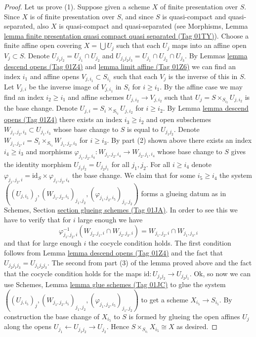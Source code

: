 \documentclass{amsart}
\theoremstyle{plain}
\theoremstyle{definition}
\theoremstyle{remark}
\numberwithin{equation}{subsection}
\begin{document}
\begin{proof}
\medskip\noindent
Let us prove (1). Suppose given a scheme $X$ of finite presentation
over $S$. Since $X$ is of finite presentation
over $S$, and since $S$ is quasi-compact and quasi-separated, also
$X$ is quasi-compact and quasi-separated
(see Morphisms,
Lemma \href{https://stacks.math.columbia.edu/tag/01TY}{lemma finite presentation quasi compact quasi separated (Tag 01TY)}).
Choose a finite affine open covering $X = \bigcup U_j$
such that each $U_j$ maps into an affine open $V_j \subset S$.
Denote $U_{j_1j_2} = U_{j_1} \cap U_{j_2}$ and
$U_{j_1j_2j_3} = U_{j_1} \cap U_{j_2} \cap U_{j_3}$.
By Lemmas \href{https://stacks.math.columbia.edu/tag/01Z4}{lemma descend opens (Tag 01Z4)} and \href{https://stacks.math.columbia.edu/tag/01Z6}{lemma limit affine (Tag 01Z6)}
we can find an index $i_1$ and affine opens $V_{j, i_1} \subset S_{i_1}$
such that each $V_j$ is the inverse of this in $S$.
Let $V_{j, i}$ be the inverse image of $V_{j, i_1}$ in $S_i$ for
$i \geq i_1$. By the affine case we may find an index $i_2 \geq i_1$ and
affine schemes $U_{j, i_2} \to V_{j, i_2}$ such
that $U_j = S \times_{S_{i_2}} U_{j, i_2}$ is the base change.
Denote $U_{j, i} = S_i \times_{S_{i_2}} U_{j, i_2}$ for $i \geq i_2$.
By Lemma \href{https://stacks.math.columbia.edu/tag/01Z4}{lemma descend opens (Tag 01Z4)} there exists an index
$i_3 \geq i_2$ and open subschemes
$W_{j_1, j_2, i_3} \subset U_{j_1, i_3}$
whose base change to $S$ is equal to $U_{j_1j_2}$.
Denote $W_{j_1, j_2, i} = S_i \times_{S_{i_3}} W_{j_1, j_2, i_3}$
for $i \geq i_3$. By part (2) shown above there exists an index
$i_4 \geq i_3$ and morphisms
$\varphi_{j_1, j_2, i_4} : W_{j_1, j_2, i_4} \to W_{j_2, j_1, i_4}$
whose base change to $S$ gives the identity morphism
$U_{j_1j_2} = U_{j_2j_1}$ for all $j_1, j_2$.
For all $i \geq i_4$ denote
$\varphi_{j_1, j_2, i} = \text{id}_S \times \varphi_{j_1, j_2, i_4}$
the base change. We claim that for some $i_5 \geq i_4$ the system
$((U_{j, i_5})_j, (W_{j_1, j_2, i_5})_{j_1, j_2},
(\varphi_{j_1, j_2, i_5})_{j_1, j_2})$ forms a glueing datum
as in Schemes, Section \href{https://stacks.math.columbia.edu/tag/01JA}{section glueing schemes (Tag 01JA)}.
In order to see this we have to verify that for $i$ large enough
we have
$$
\varphi_{j_1, j_2, i}^{-1}(W_{j_2, j_1, i} \cap W_{j_2, j_3, i})
=
W_{j_1, j_2, i} \cap W_{j_1, j_3, i}
$$
and that for large enough $i$ the cocycle condition holds.
The first condition follows from Lemma \href{https://stacks.math.columbia.edu/tag/01Z4}{lemma descend opens (Tag 01Z4)}
and the fact that $U_{j_2j_1j_3} = U_{j_1j_2j_3}$.
The second from part (3) of the lemma proved above and the fact
that the cocycle condition holds for the maps
$\text{id} : U_{j_1j_2} \to U_{j_2j_1}$.
Ok, so now we can use Schemes, Lemma \href{https://stacks.math.columbia.edu/tag/01JC}{lemma glue schemes (Tag 01JC)}
to glue the system
$((U_{j, i_5})_j, (W_{j_1, j_2, i_5})_{j_1, j_2},
(\varphi_{j_1, j_2, i_5})_{j_1, j_2})$ to get a scheme
$X_{i_5} \to S_{i_5}$. By construction the base change of
$X_{i_5}$ to $S$ is formed by glueing the open affines
$U_j$ along the opens $U_{j_1} \leftarrow U_{j_1j_2} \rightarrow U_{j_2}$.
Hence $S \times_{S_{i_5}} X_{i_5} \cong X$ as desired.
\end{proof}
\end{document}
